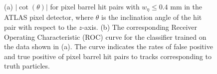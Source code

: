 \begin{figure}[htbp!] 
    \centering
    \hfill%
    \caption{(a) $\lvert \cot(\theta) \rvert$ for pixel barrel hit pairs with $w_{\eta} \leq 0.4$ mm in the ATLAS pixel detector, where $\theta$ is the inclination angle of the hit pair with respect to the $z$-axis. (b) The corresponding Receiver Operating Characteristic (ROC) curve for the classifier trained on the data shown in (a). The curve indicates the rates of false positive and true positive of pixel barrel hit pairs to tracks corresponding to truth particles.}
    \label{fig:1-dimensional-classifier-training}
\end{figure}


